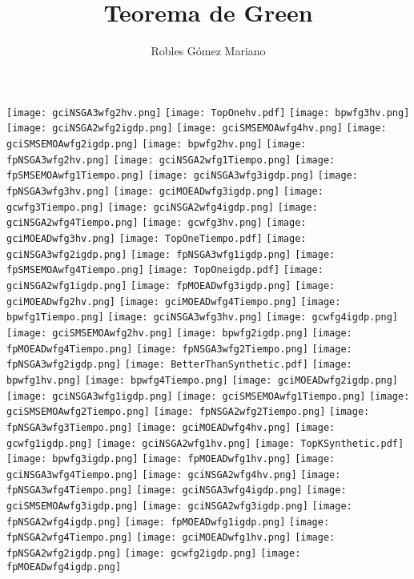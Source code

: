 \documentclass{article}
\title{Teorema de Green}
\author{Robles Gómez Mariano}
\begin{document}
	\maketitle
	\texttt{[image: gciNSGA3wfg2hv.png]}
	\texttt{[image: TopOnehv.pdf]}
	\texttt{[image: bpwfg3hv.png]}
	\texttt{[image: gciNSGA2wfg2igdp.png]}
	\texttt{[image: gciSMSEMOAwfg4hv.png]}
	\texttt{[image: gciSMSEMOAwfg2igdp.png]}
	\texttt{[image: bpwfg2hv.png]}
	\texttt{[image: fpNSGA3wfg2hv.png]}
	\texttt{[image: gciNSGA2wfg1Tiempo.png]}
	\texttt{[image: fpSMSEMOAwfg1Tiempo.png]}
	\texttt{[image: gciNSGA3wfg3igdp.png]}
	\texttt{[image: fpNSGA3wfg3hv.png]}
	\texttt{[image: gciMOEADwfg3igdp.png]}
	\texttt{[image: gcwfg3Tiempo.png]}
	\texttt{[image: gciNSGA2wfg4igdp.png]}
	\texttt{[image: gciNSGA2wfg4Tiempo.png]}
	\texttt{[image: gcwfg3hv.png]}
	\texttt{[image: gciMOEADwfg3hv.png]}
	\texttt{[image: TopOneTiempo.pdf]}
	\texttt{[image: gciNSGA3wfg2igdp.png]}
	\texttt{[image: fpNSGA3wfg1igdp.png]}
	\texttt{[image: fpSMSEMOAwfg4Tiempo.png]}
	\texttt{[image: TopOneigdp.pdf]}
	\texttt{[image: gciNSGA2wfg1igdp.png]}
	\texttt{[image: fpMOEADwfg3igdp.png]}
	\texttt{[image: gciMOEADwfg2hv.png]}
	\texttt{[image: gciMOEADwfg4Tiempo.png]}
	\texttt{[image: bpwfg1Tiempo.png]}
	\texttt{[image: gciNSGA3wfg3hv.png]}
	\texttt{[image: gcwfg4igdp.png]}
	\texttt{[image: gciSMSEMOAwfg2hv.png]}
	\texttt{[image: bpwfg2igdp.png]}
	\texttt{[image: fpMOEADwfg4Tiempo.png]}
	\texttt{[image: fpNSGA3wfg2Tiempo.png]}
	\texttt{[image: fpNSGA3wfg2igdp.png]}
	\texttt{[image: BetterThanSynthetic.pdf]}
	\texttt{[image: bpwfg1hv.png]}
	\texttt{[image: bpwfg4Tiempo.png]}
	\texttt{[image: gciMOEADwfg2igdp.png]}
	\texttt{[image: gciNSGA3wfg1igdp.png]}
	\texttt{[image: gciSMSEMOAwfg1Tiempo.png]}
	\texttt{[image: gciSMSEMOAwfg2Tiempo.png]}
	\texttt{[image: fpNSGA2wfg2Tiempo.png]}
	\texttt{[image: fpNSGA3wfg3Tiempo.png]}
	\texttt{[image: gciMOEADwfg4hv.png]}
	\texttt{[image: gcwfg1igdp.png]}
	\texttt{[image: gciNSGA2wfg1hv.png]}
	\texttt{[image: TopKSynthetic.pdf]}
	\texttt{[image: bpwfg3igdp.png]}
	\texttt{[image: fpMOEADwfg1hv.png]}
	\texttt{[image: gciNSGA3wfg4Tiempo.png]}
	\texttt{[image: gciNSGA2wfg4hv.png]}
	\texttt{[image: fpNSGA3wfg4Tiempo.png]}
	\texttt{[image: gciNSGA3wfg4igdp.png]}
	\texttt{[image: gciSMSEMOAwfg3igdp.png]}
	\texttt{[image: gciNSGA2wfg3igdp.png]}
	\texttt{[image: fpNSGA2wfg4igdp.png]}
	\texttt{[image: fpMOEADwfg1igdp.png]}
	\texttt{[image: fpNSGA2wfg4Tiempo.png]}
	\texttt{[image: gciMOEADwfg1hv.png]}
	\texttt{[image: fpNSGA2wfg2igdp.png]}
	\texttt{[image: gcwfg2igdp.png]}
	\texttt{[image: fpMOEADwfg4igdp.png]}
\end{document}
